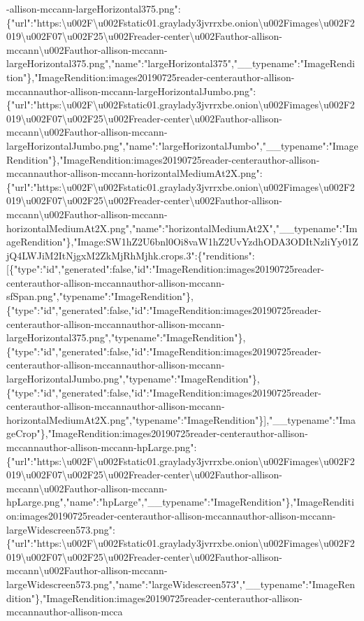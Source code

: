 -allison-mccann-largeHorizontal375.png":\{"url":"https:\textbackslash{}u002F\textbackslash{}u002Fstatic01.graylady3jvrrxbe.onion\textbackslash{}u002Fimages\textbackslash{}u002F2019\textbackslash{}u002F07\textbackslash{}u002F25\textbackslash{}u002Freader-center\textbackslash{}u002Fauthor-allison-mccann\textbackslash{}u002Fauthor-allison-mccann-largeHorizontal375.png","name":"largeHorizontal375","\_\_typename":"ImageRendition"\},"ImageRendition:images20190725reader-centerauthor-allison-mccannauthor-allison-mccann-largeHorizontalJumbo.png":\{"url":"https:\textbackslash{}u002F\textbackslash{}u002Fstatic01.graylady3jvrrxbe.onion\textbackslash{}u002Fimages\textbackslash{}u002F2019\textbackslash{}u002F07\textbackslash{}u002F25\textbackslash{}u002Freader-center\textbackslash{}u002Fauthor-allison-mccann\textbackslash{}u002Fauthor-allison-mccann-largeHorizontalJumbo.png","name":"largeHorizontalJumbo","\_\_typename":"ImageRendition"\},"ImageRendition:images20190725reader-centerauthor-allison-mccannauthor-allison-mccann-horizontalMediumAt2X.png":\{"url":"https:\textbackslash{}u002F\textbackslash{}u002Fstatic01.graylady3jvrrxbe.onion\textbackslash{}u002Fimages\textbackslash{}u002F2019\textbackslash{}u002F07\textbackslash{}u002F25\textbackslash{}u002Freader-center\textbackslash{}u002Fauthor-allison-mccann\textbackslash{}u002Fauthor-allison-mccann-horizontalMediumAt2X.png","name":"horizontalMediumAt2X","\_\_typename":"ImageRendition"\},"Image:SW1hZ2U6bnl0Oi8vaW1hZ2UvYzdhODA3ODItNzliYy01ZjQ4LWJiM2ItNjgxM2ZkMjRhMjhk.crops.3":\{"renditions":{[}\{"type":"id","generated":false,"id":"ImageRendition:images20190725reader-centerauthor-allison-mccannauthor-allison-mccann-sfSpan.png","typename":"ImageRendition"\},\{"type":"id","generated":false,"id":"ImageRendition:images20190725reader-centerauthor-allison-mccannauthor-allison-mccann-largeHorizontal375.png","typename":"ImageRendition"\},\{"type":"id","generated":false,"id":"ImageRendition:images20190725reader-centerauthor-allison-mccannauthor-allison-mccann-largeHorizontalJumbo.png","typename":"ImageRendition"\},\{"type":"id","generated":false,"id":"ImageRendition:images20190725reader-centerauthor-allison-mccannauthor-allison-mccann-horizontalMediumAt2X.png","typename":"ImageRendition"\}{]},"\_\_typename":"ImageCrop"\},"ImageRendition:images20190725reader-centerauthor-allison-mccannauthor-allison-mccann-hpLarge.png":\{"url":"https:\textbackslash{}u002F\textbackslash{}u002Fstatic01.graylady3jvrrxbe.onion\textbackslash{}u002Fimages\textbackslash{}u002F2019\textbackslash{}u002F07\textbackslash{}u002F25\textbackslash{}u002Freader-center\textbackslash{}u002Fauthor-allison-mccann\textbackslash{}u002Fauthor-allison-mccann-hpLarge.png","name":"hpLarge","\_\_typename":"ImageRendition"\},"ImageRendition:images20190725reader-centerauthor-allison-mccannauthor-allison-mccann-largeWidescreen573.png":\{"url":"https:\textbackslash{}u002F\textbackslash{}u002Fstatic01.graylady3jvrrxbe.onion\textbackslash{}u002Fimages\textbackslash{}u002F2019\textbackslash{}u002F07\textbackslash{}u002F25\textbackslash{}u002Freader-center\textbackslash{}u002Fauthor-allison-mccann\textbackslash{}u002Fauthor-allison-mccann-largeWidescreen573.png","name":"largeWidescreen573","\_\_typename":"ImageRendition"\},"ImageRendition:images20190725reader-centerauthor-allison-mccannauthor-allison-mcca